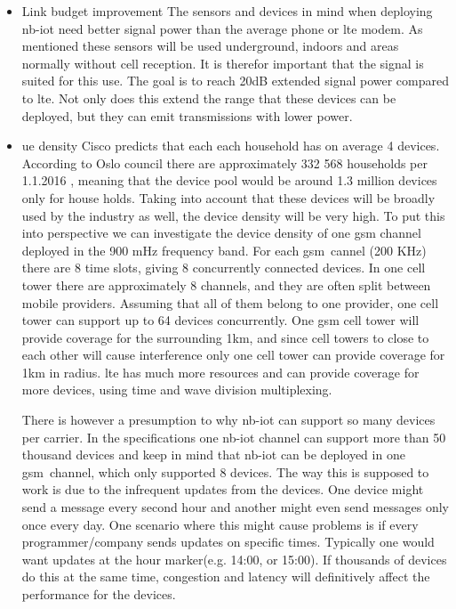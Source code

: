 \documentclass[USenglish]{ifimaster}  %
\begin{document}
\begin{itemize}
  \item Link budget improvement \newline
  The sensors and devices in mind when deploying \acrshort{nb-iot} need better signal power than the average phone or \acrshort{lte} modem. As mentioned these sensors will be used underground, indoors and areas normally without cell reception. It is therefor important that the signal is suited for this use. The goal is to reach 20dB extended signal power compared to \acrshort{lte}. Not only does this extend the range that these devices can be deployed, but they can emit transmissions with lower power.

  \item \acrshort{ue} density \newline
  Cisco predicts that each each household has on average 4 devices\cite{online:IoT2020}. According to Oslo council there are approximately 332 568 households per 1.1.2016 \cite{online:husholdningstatistikk}, meaning that the device pool would be around 1.3 million devices only for house holds. Taking into account that these devices will be broadly used by the industry as well, the device density will be very high. To put this into perspective we can investigate the device density of one \acrshort{gsm} channel deployed in the 900 mHz frequency band. For each \acrshort{gsm} cannel (200 KHz) there are 8 time slots, giving 8 concurrently connected devices. In one cell tower there are approximately 8 channels, and they are often split between mobile providers. Assuming that all of them belong to one provider, one cell tower can support up to 64 devices concurrently. One \acrshort{gsm} cell tower will provide coverage for the surrounding 1km, and since cell towers to close to each other will cause interference only one cell tower can provide coverage for 1km in radius. \acrshort{lte} has much more resources and can provide coverage for more devices, using time and wave division multiplexing.

  There is however a presumption to why \acrshort{nb-iot} can support so many devices per carrier. In the specifications one \acrshort{nb-iot} channel can support more than 50 thousand devices and keep in mind that \acrshort{nb-iot} can be deployed in one \acrshort{gsm} channel, which only supported 8 devices. The way this is supposed to work is due to the infrequent updates from the devices. One device might send a message every second hour and another might even send messages only once every day. One scenario where this might cause problems is if every programmer/company sends updates on specific times. Typically one would want updates at the hour marker(e.g. 14:00, or 15:00). If thousands of devices do this at the same time, congestion and latency will definitively affect the performance for the devices.


\end{itemize}
\end{document}

